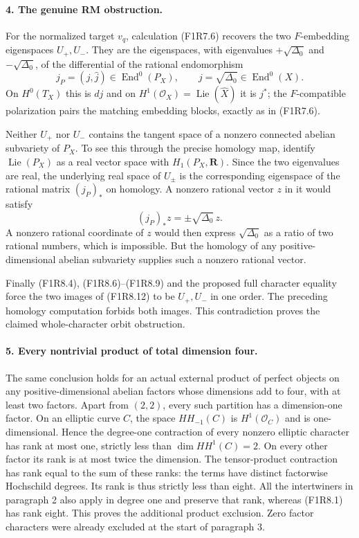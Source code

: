 \paragraph{4. The genuine RM obstruction.}
For the normalized target $v_q$, calculation (F1R7.6) recovers
the two $F$-embedding eigenspaces $U_+,U_-$. They are the
eigenspaces, with eigenvalues $+\sqrt{\Delta_0}$ and
$-\sqrt{\Delta_0}$, of the differential of the rational
endomorphism
\[
 j_P=(j,\widehat j)\in\operatorname{End}^0(P_X),\qquad
 j=\sqrt{\Delta_0}\in\operatorname{End}^0(X).
 \tag{F1R8.13}
\]
On $H^0(T_X)$ this is $dj$ and on
$H^1(\mathcal O_X)=\operatorname{Lie}(\widehat X)$ it is $j^*$;
the $F$-compatible polarization pairs the matching embedding
blocks, exactly as in (F1R7.6).

Neither $U_+$ nor $U_-$ contains the tangent space of a
nonzero connected abelian subvariety of $P_X$. To see this
through the precise homology map, identify
$\operatorname{Lie}(P_X)$ as a real vector space with
$H_1(P_X,\mathbf R)$. Since the two eigenvalues are real,
the underlying real space of $U_\pm$ is the corresponding
eigenspace of the rational matrix $(j_P)_*$ on homology.
A nonzero rational vector $z$ in it would satisfy
\[
 (j_P)_*z=\pm\sqrt{\Delta_0}\,z.
 \tag{F1R8.14}
\]
A nonzero rational coordinate of $z$ would then express
$\sqrt{\Delta_0}$ as a ratio of two rational numbers, which
is impossible. But the homology of any positive-dimensional
abelian subvariety supplies such a nonzero rational vector.

Finally (F1R8.4), (F1R8.6)--(F1R8.9) and the proposed full
character equality force the two images of (F1R8.12) to be
$U_+,U_-$ in one order. The preceding homology computation
forbids both images. This contradiction proves the claimed
whole-character orbit obstruction.

\paragraph{5. Every nontrivial product of total dimension four.}
The same conclusion holds for an actual external product of
perfect objects on any positive-dimensional abelian factors
whose dimensions add to four, with at least two factors.
Apart from $(2,2)$, every such partition has a dimension-one
factor. On an elliptic curve $C$, the space $HH_{-1}(C)$ is
$H^1(\mathcal O_C)$ and is one-dimensional. Hence the
degree-one contraction of every nonzero elliptic character
has rank at most one, strictly less than
$\dim HH^1(C)=2$. On every other factor its rank is at most
twice the dimension. The tensor-product contraction has
rank equal to the sum of these ranks: the terms have
distinct factorwise Hochschild degrees. Its rank is thus
strictly less than eight. All the intertwiners in paragraph 2
also apply in degree one and preserve that rank, whereas
(F1R8.1) has rank eight. This proves the additional product
exclusion. Zero factor characters were already excluded
at the start of paragraph 3.

